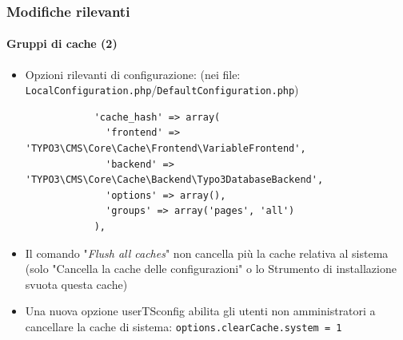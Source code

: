 \begin{frame}[fragile]
	\frametitle{Modifiche rilevanti}
	\framesubtitle{Gruppi di cache (2)}

	\lstset{
		basicstyle=\tiny\ttfamily
	}

	\begin{itemize}

		\item Opzioni rilevanti di configurazione:\newline
			\smaller(nei file: \texttt{LocalConfiguration.php}/\texttt{DefaultConfiguration.php})\normalsize

			\begin{lstlisting}
			'cache_hash' => array(
			  'frontend' => 'TYPO3\CMS\Core\Cache\Frontend\VariableFrontend',
			  'backend' => 'TYPO3\CMS\Core\Cache\Backend\Typo3DatabaseBackend',
			  'options' => array(),
			  'groups' => array('pages', 'all')
			),
			\end{lstlisting}

		\item Il comando "\textit{Flush all caches}" non cancella più la cache relativa al sistema
			(solo "Cancella la cache delle configurazioni" o lo Strumento di installazione svuota questa cache)
		\item Una nuova opzione userTSconfig abilita gli utenti non amministratori a cancellare la cache di sistema:\newline
			\smaller\texttt{options.clearCache.system = 1}\normalsize

		\breakingchange

	\end{itemize}

\end{frame}


